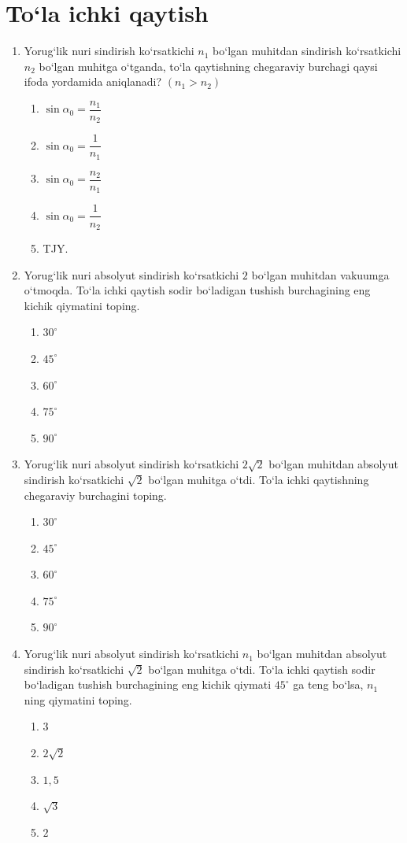 \section{To‘la ichki qaytish}


\begin{enumerate}

\item Yorug‘lik nuri sindirish ko‘rsatkichi $n_1$ bo‘lgan muhitdan sindirish ko‘rsatkichi $n_2$ bo‘lgan muhitga o‘tganda, to‘la qaytishning chegaraviy burchagi qaysi ifoda yordamida aniqlanadi? $(n_1>n_2)$
\begin{enumerate}[label=\Alph*)]
\item $\sin\alpha_0=\dfrac{n_1}{n_2}$
\item $\sin\alpha_0=\dfrac{1}{n_1}$
\item $\sin\alpha_0=\dfrac{n_2}{n_1}$
\item $\sin\alpha_0=\dfrac{1}{n_2}$
\item TJY.
\end{enumerate}

\item Yorug‘lik nuri absolyut sindirish ko‘rsatkichi $2$ bo‘lgan muhitdan vakuumga o‘tmoqda. To‘la ichki qaytish sodir bo‘ladigan tushish burchagining eng kichik qiymatini toping.
\begin{enumerate}[label=\Alph*)]
\item $30^\circ$
\item $45^\circ$
\item $60^\circ$
\item $75^\circ$
\item $90^\circ$
\end{enumerate}

\item Yorug‘lik nuri absolyut sindirish ko‘rsatkichi $2\sqrt{2}$ bo‘lgan muhitdan absolyut sindirish ko‘rsatkichi $\sqrt{2}$ bo‘lgan muhitga o‘tdi. To‘la ichki qaytishning chegaraviy burchagini toping.
\begin{enumerate}[label=\Alph*)]
\item $30^\circ$
\item $45^\circ$
\item $60^\circ$
\item $75^\circ$
\item $90^\circ$
\end{enumerate}

\item Yorug‘lik nuri absolyut sindirish ko‘rsatkichi $n_1$ bo‘lgan muhitdan absolyut sindirish ko‘rsatkichi $\sqrt{2}$ bo‘lgan muhitga o‘tdi. To‘la ichki qaytish sodir bo‘ladigan tushish burchagining eng kichik qiymati $45^\circ$ ga teng bo‘lsa, $n_1$ ning qiymatini toping.
\begin{enumerate}[label=\Alph*)]
\item $3$
\item $2\sqrt{2}$
\item $1,5$
\item $\sqrt{3}$
\item $2$
\end{enumerate}


\end{enumerate}
